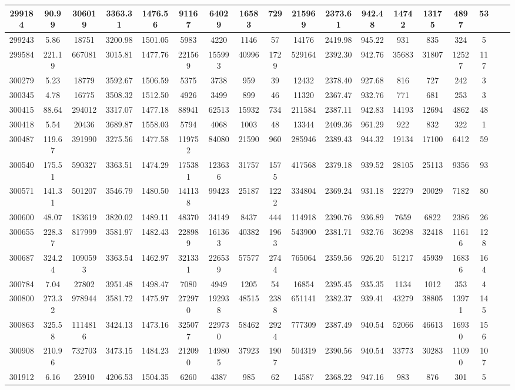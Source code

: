 \documentclass[10pt]{extarticle}
\begin{document}
\begin{longtable}{|c|c|c|c|c|c|c|c|c|c|c|c|c|c|c|c|c|c|}
\hline 
299184&90.99&306019&3363.31&1476.56&91167&64029&16583&729&215969&2373.61&942.48&14742&13175&4897&53 \\ 
\hline 
299243&5.86&18751&3200.98&1501.05&5983&4220&1146&57&14176&2419.98&945.22&931&835&324&5 \\ 
\hline 
299584&221.19&667081&3015.81&1477.76&221569&155993&40996&1729&529164&2392.30&942.76&35683&31807&12527&117 \\ 
\hline 
300279&5.23&18779&3592.67&1506.59&5375&3738&959&39&12432&2378.40&927.68&816&727&242&3 \\ 
\hline 
300345&4.78&16775&3508.32&1512.50&4926&3499&899&46&11320&2367.47&932.76&771&681&253&3 \\ 
\hline 
300415&88.64&294012&3317.07&1477.18&88941&62513&15932&734&211584&2387.11&942.83&14193&12694&4862&48 \\ 
\hline 
300418&5.54&20436&3689.87&1558.03&5794&4068&1003&48&13344&2409.36&961.29&922&832&322&1 \\ 
\hline 
300487&119.67&391990&3275.56&1477.58&119752&84080&21590&960&285946&2389.43&944.32&19134&17100&6412&59 \\ 
\hline 
300540&175.51&590327&3363.51&1474.29&175381&123636&31757&1575&417568&2379.18&939.52&28105&25113&9356&93 \\ 
\hline 
300571&141.31&501207&3546.79&1480.50&141138&99423&25187&1222&334804&2369.24&931.18&22279&20029&7182&80 \\ 
\hline 
300600&48.07&183619&3820.02&1489.11&48370&34149&8437&444&114918&2390.76&936.89&7659&6822&2386&26 \\ 
\hline 
300655&228.37&817999&3581.97&1482.43&228989&161363&40382&1963&543900&2381.71&932.76&36298&32418&11616&128 \\ 
\hline 
300687&324.24&1090593&3363.54&1462.97&321331&226539&57577&2744&765064&2359.56&926.20&51217&45939&16836&164 \\ 
\hline 
300784&7.04&27802&3951.48&1498.47&7080&4949&1205&54&16854&2395.45&935.35&1134&1012&353&4 \\ 
\hline 
300800&273.32&978944&3581.72&1475.97&272970&192938&48515&2388&651141&2382.37&939.41&43279&38805&13971&145 \\ 
\hline 
300863&325.58&1114816&3424.13&1473.16&325077&229730&58462&2924&777309&2387.49&940.54&52066&46613&16930&156 \\ 
\hline 
300908&210.96&732703&3473.15&1484.23&212090&149805&37923&1907&504319&2390.56&940.54&33773&30283&11090&107 \\ 
\hline 
301912&6.16&25910&4206.53&1504.35&6260&4387&985&62&14587&2368.22&947.16&983&876&301&5 \\ 

\end{longtable}
\end{document}
